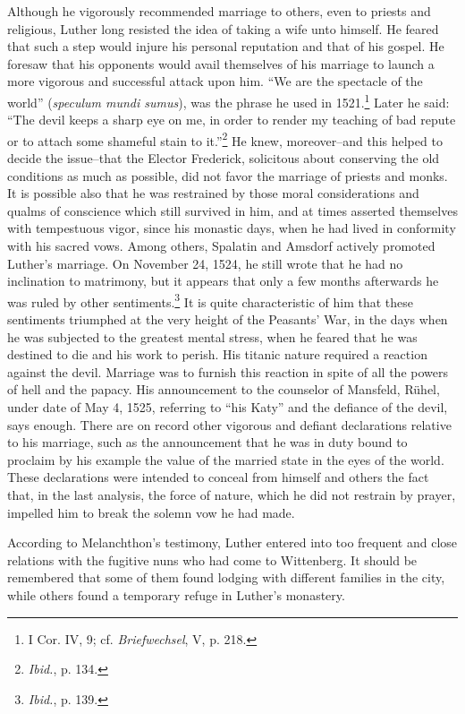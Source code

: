 Although he vigorously recommended marriage to others, even to
priests and religious, Luther long resisted the idea of taking a wife
unto himself. He feared that such a step would injure his personal
reputation and that of his gospel. He foresaw that his opponents
would avail themselves of his marriage to launch a more vigorous
and successful attack upon him. “We are the spectacle of the world”
(\textit{speculum mundi sumus}), was the phrase he used in 1521.\footnote
{I Cor. IV, 9; cf. \textit{Briefwechsel}, V, p. 218.}
Later he
said: “The devil keeps a sharp eye on me, in order to render my
teaching of bad repute or to attach some shameful stain to it.”\footnote{\textit{Ibid.}, p. 134.}
He knew, moreover--and this helped to decide the issue--that the Elector
Frederick, solicitous about conserving the old conditions as much as
possible, did not favor the marriage of priests and monks. It is possible
also that he was restrained by those moral considerations and
qualms of conscience which still survived in him, and at times asserted
themselves with tempestuous vigor, since his monastic days,
when he had lived in conformity with his sacred vows.
Among others, Spalatin and Amsdorf actively promoted Luther’s
marriage. On November 24, 1524, he still wrote that he had no inclination
to matrimony, but it appears that only a few months afterwards he was
ruled by other sentiments.\footnote{\textit{Ibid.}, p. 139.}
It is quite characteristic
of him that these sentiments triumphed at the very height of the
Peasants’ War, in the days when he was subjected to the greatest
mental stress, when he feared that he was destined to die and his
work to perish. His titanic nature required a reaction against the
devil. Marriage was to furnish this reaction in spite of all the powers
of hell and the papacy. His announcement to the counselor of Mansfeld,
Rühel, under date of May 4, 1525, referring to “his Katy” and
the defiance of the devil, says enough. There are on record other vigorous
and defiant declarations relative to his marriage, such as the
announcement that he was in duty bound to proclaim by his example the
value of the married state in the eyes of the world. These
declarations were intended to conceal from himself and others the
fact that, in the last analysis, the force of nature, which he did not
restrain by prayer, impelled him to break the solemn vow he had made.

According to Melanchthon’s testimony, Luther entered into too
frequent and close relations with the fugitive nuns who had come
to Wittenberg. It should be remembered that some of them found
lodging with different families in the city, while others found a temporary
refuge in Luther’s monastery.

